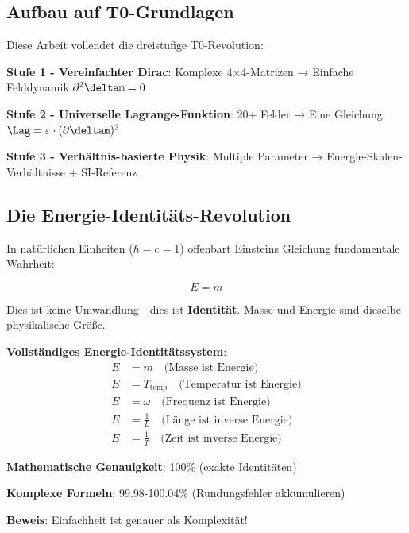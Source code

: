 	\subsection{Aufbau auf T0-Grundlagen}
	
	Diese Arbeit vollendet die dreistufige T0-Revolution:
	
	\textbf{Stufe 1 - Vereinfachter Dirac}: Komplexe 4×4-Matrizen → Einfache Felddynamik $\partial^2 \deltam = 0$
	
	\textbf{Stufe 2 - Universelle Lagrange-Funktion}: 20+ Felder → Eine Gleichung $\Lag = \varepsilon \cdot (\partial \deltam)^2$
	
	\textbf{Stufe 3 - Verhältnis-basierte Physik}: Multiple Parameter → Energie-Skalen-Verhältnisse + SI-Referenz
	
	\subsection{Die Energie-Identitäts-Revolution}
	
	In natürlichen Einheiten ($\hbar = c = 1$) offenbart Einsteins Gleichung fundamentale Wahrheit:
	
	\begin{equation}
		\boxed{E = m}
		\label{eq:energy_mass_identity}
	\end{equation}
	
	Dies ist keine Umwandlung - dies ist \textbf{Identität}. Masse und Energie sind dieselbe physikalische Größe.
	
	\begin{tcolorbox}[colback=blue!5!white,colframe=blue!75!black,title=Universelle Energie-Beziehungen]
		\textbf{Vollständiges Energie-Identitätssystem}:
		\begin{align}
			E &= m \quad \text{(Masse ist Energie)} \\
			E &= T_{\text{temp}} \quad \text{(Temperatur ist Energie)} \\
			E &= \omega \quad \text{(Frequenz ist Energie)} \\
			E &= \frac{1}{L} \quad \text{(Länge ist inverse Energie)} \\
			E &= \frac{1}{T} \quad \text{(Zeit ist inverse Energie)}
		\end{align}
		
		\textbf{Mathematische Genauigkeit}: 100\% (exakte Identitäten)
		
		\textbf{Komplexe Formeln}: 99.98-100.04\% (Rundungsfehler akkumulieren)
		
		\textbf{Beweis}: Einfachheit ist genauer als Komplexität!
	\end{tcolorbox}
	
